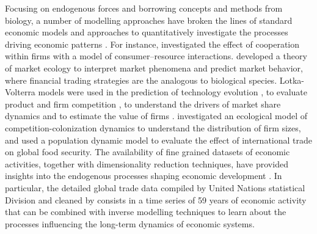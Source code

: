   Focusing on endogenous forces and borrowing concepts and methods from biology, a number of modelling approaches have broken the lines of standard economic models and approaches to quantitatively investigate the processes driving economic patterns \cite{Tacchella2018}.
  For instance, \cite{Saavedra2009a} investigated the effect of cooperation within firms with a model of consumer–resource interactions. \cite{Scholl2020} developed a theory of market ecology to interpret market phenomena and predict market behavior, where financial trading strategies are the analogous to biological species.
  Lotka-Volterra models were used in the prediction of technology evolution \cite{Zhang2018}, to evaluate product and firm competition \cite{Modis1997,Saavedra2014}, to understand the drivers of market share dynamics \cite{Farmer1999,Michalakelis2011,Marasco2016,Gatabazi2019} and to estimate the value of firms \cite{Cauwels56}.
  \cite{Applegate2021} investigated an ecological model of competition-colonization dynamics to understand the distribution of firm sizes, and \cite{Suweis2015} used a population dynamic model to evaluate the effect of international trade on global food security.
  The availability of fine grained datasets of economic activities, together with dimensionality reduction techniques, have provided insights into the endogenous processes shaping economic development \cite{Mealy2019,Hidalgo2021}.
  In particular, the detailed global trade data compiled by United Nations statistical Division and cleaned by \cite{Hidalgo2021} consists in a time series of 59 years of economic activity that can be combined with inverse modelling techniques to learn about the processes influencing the long-term dynamics of economic systems.
  
